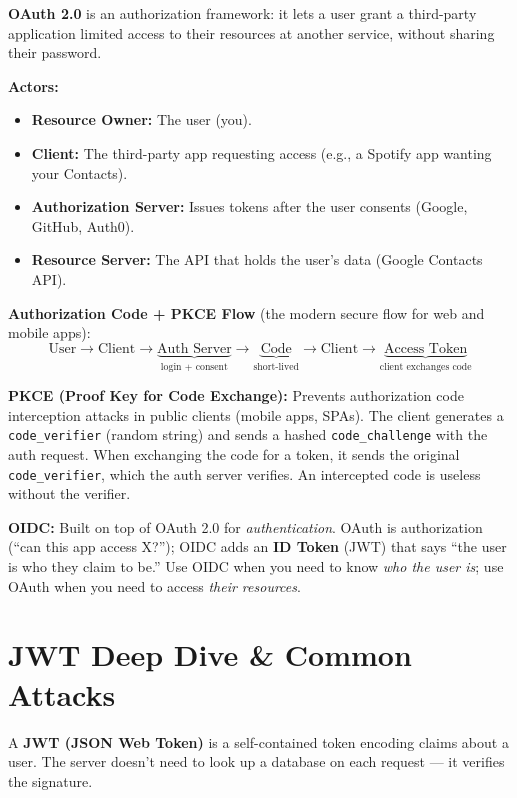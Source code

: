 \documentclass[11pt, letterpaper]{article}
\begin{document}
\textbf{OAuth 2.0} is an authorization framework: it lets a user grant a third-party application limited access to their resources at another service, without sharing their password.

\textbf{Actors:}
\begin{itemize}[noitemsep]
  \item \textbf{Resource Owner:} The user (you).
  \item \textbf{Client:} The third-party app requesting access (e.g., a Spotify app wanting your Contacts).
  \item \textbf{Authorization Server:} Issues tokens after the user consents (Google, GitHub, Auth0).
  \item \textbf{Resource Server:} The API that holds the user's data (Google Contacts API).
\end{itemize}

\textbf{Authorization Code + PKCE Flow} (the modern secure flow for web and mobile apps):
\[
  \text{User} \to \text{Client} \to \underbrace{\text{Auth Server}}_{\text{login + consent}} \to \underbrace{\text{Code}}_{\text{short-lived}} \to \text{Client} \to \underbrace{\text{Access Token}}_{\text{client exchanges code}}
\]

\begin{tcolorbox}[colback=partbg, colframe=sectionblue, arc=3pt, boxrule=1pt]
\textbf{PKCE (Proof Key for Code Exchange):} Prevents authorization code interception attacks in public clients (mobile apps, SPAs). The client generates a \texttt{code\_verifier} (random string) and sends a hashed \texttt{code\_challenge} with the auth request. When exchanging the code for a token, it sends the original \texttt{code\_verifier}, which the auth server verifies. An intercepted code is useless without the verifier.

\textbf{OIDC:} Built on top of OAuth 2.0 for \emph{authentication}. OAuth is authorization (``can this app access X?''); OIDC adds an \textbf{ID Token} (JWT) that says ``the user is who they claim to be.'' Use OIDC when you need to know \emph{who the user is}; use OAuth when you need to access \emph{their resources}.
\end{tcolorbox}

\section*{JWT Deep Dive \& Common Attacks}

A \textbf{JWT (JSON Web Token)} is a self-contained token encoding claims about a user. The server doesn't need to look up a database on each request --- it verifies the signature.
\end{document}
